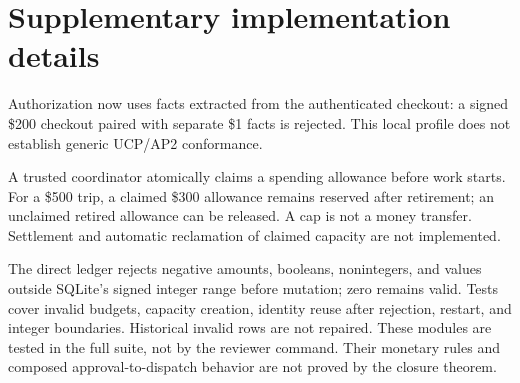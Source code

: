 \documentclass[11pt]{article}
\begin{document}
\section{Supplementary implementation details}
\label{app:implementation}
Authorization now uses facts extracted from the authenticated checkout: a
signed \$200 checkout paired with separate \$1 facts is rejected. This local
profile does not establish generic UCP/AP2 conformance.

A trusted coordinator atomically claims a spending allowance before work starts.
For a \$500 trip, a claimed \$300 allowance remains reserved after retirement;
an unclaimed retired allowance can be released. A cap is not a money transfer.
Settlement and automatic reclamation of claimed capacity are not implemented.

The direct ledger rejects negative amounts, booleans, nonintegers, and values
outside SQLite's signed integer range before mutation; zero remains valid.
Tests cover invalid budgets, capacity creation, identity reuse after rejection,
restart, and integer boundaries. Historical invalid rows are not repaired.
These modules are tested in the full suite, not by the reviewer command.
Their monetary rules and composed approval-to-dispatch behavior are not proved
by the closure theorem.

\begingroup
\small
\raggedright

\endgroup
\end{document}
